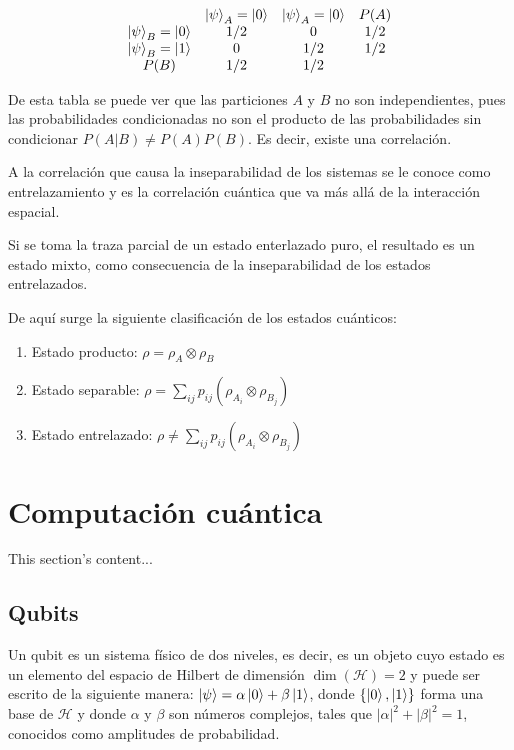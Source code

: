 \[
\begin{array}{c c c c}
    & \ket{\psi}_A = \ket{0} & \ket{\psi}_A = \ket{0} & P(A) \\
    \ket{\psi}_B = \ket{0} & 1/2 & 0 & 1/2 \\
    \ket{\psi}_B = \ket{1} & 0 & 1/2 & 1/2 \\
    P(B) & 1/2 & 1/2 &
\end{array}
\]

De esta tabla se puede ver que las particiones $A$ y $B$ no son independientes, pues las probabilidades condicionadas no son el producto de las probabilidades sin condicionar $P(A|B) \neq P(A)P(B)$. Es decir, existe una correlación.

A la correlación que causa la inseparabilidad de los sistemas se le conoce como entrelazamiento y es la correlación cuántica que va más allá de la interacción espacial.

Si se toma la traza parcial de un estado enterlazado puro, el resultado es un estado mixto, como consecuencia de la inseparabilidad de los estados entrelazados.

De aquí surge la siguiente clasificación de los estados cuánticos:

\begin{enumerate}
    \item Estado producto: $\rho = \rho_A \otimes \rho_B$
    \item Estado separable: $\rho = \sum\limits_{i j} p_{i j} (\rho_{A_i} \otimes \rho_{B_j})$
    \item Estado entrelazado: $\rho \neq \sum\limits_{i j} p_{i j} (\rho_{A_i} \otimes \rho_{B_j})$
\end{enumerate}


\section{Computación cuántica}
This section's content...

\subsection{Qubits}
Un qubit es un sistema físico de dos niveles, es decir, es un objeto cuyo estado es un elemento del espacio de Hilbert de dimensión $\dim (\mathcal{H})=2$ y puede ser escrito de la siguiente manera: $ \ket{\psi} = \alpha \ket{0} + \beta \ket{1} $, donde $ \{ \ket{0},\ket{1} \} $ forma una base de $\mathcal{H}$ y donde $ \alpha $ y $ \beta $ son números complejos, tales que $ | \alpha |^2 + | \beta |^2 = 1 $, conocidos como amplitudes de probabilidad.

